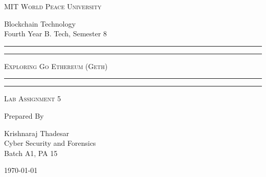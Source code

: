 \documentclass[11pt]{article}
\begin{document}
\begin{titlepage}
	\centering


	\huge\textsc{
		MIT World Peace University
	}\\

	\vspace{0.75\baselineskip} %

	\LARGE{
        Blockchain Technology\\
		Fourth Year B. Tech, Semester 8
	}

	\vfill %


	\rule{\textwidth}{1.6pt}\vspace*{-\baselineskip}\vspace*{2pt}
	\rule{\textwidth}{0.6pt}
	\vspace{0.75\baselineskip} %

	\huge{\textsc{
        Exploring Go Ethereum (Geth)
        }} \\

	\vspace{0.5\baselineskip} %
	\rule{\textwidth}{0.6pt}\vspace*{-\baselineskip}\vspace*{2.8pt}
	\rule{\textwidth}{1.6pt}

	\vspace{1\baselineskip} %


	\LARGE\textsc{
		Lab Assignment 5
	} %
	\vfill


	Prepared By \vspace{0.5\baselineskip} %

	\Large{
		Krishnaraj Thadesar \\
		Cyber Security and Forensics\\
        Batch A1, PA 15
	}

	\vspace{0.5\baselineskip} %
	\today

\end{titlepage}
\end{document}
